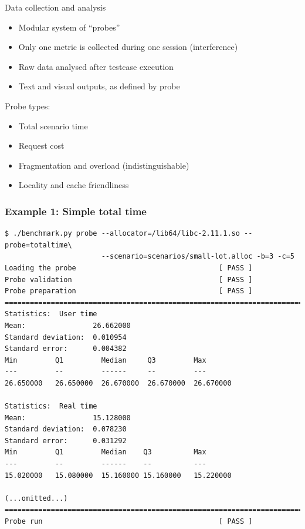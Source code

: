 \documentclass{beamer}
\begin{document}
\begin{frame}{Data collection and analysis}
\begin{itemize}
\item Modular system of ``probes''
\item Only one metric is collected during one session (interference)
\item Raw data analysed after testcase execution
\item Text and visual outputs, as defined by probe
\end{itemize}
Probe types:
\begin{itemize}
  \item Total scenario time
  \item Request cost
  \item Fragmentation and overload (indistinguishable)
  \item Locality and cache friendliness
\end{itemize}
\end{frame}

\begin{frame}[fragile]
\frametitle{Example 1: Simple total time}
\tiny
\begin{verbatim}
$ ./benchmark.py probe --allocator=/lib64/libc-2.11.1.so --probe=totaltime\
                       --scenario=scenarios/small-lot.alloc -b=3 -c=5
Loading the probe                                  [ PASS ]
Probe validation                                   [ PASS ]
Probe preparation                                  [ PASS ]
================================================================================
Statistics:  User time
Mean:                26.662000
Standard deviation:  0.010954
Standard error:      0.004382
Min         Q1         Median     Q3         Max       
---         --         ------     --         ---
26.650000   26.650000  26.670000  26.670000  26.670000

Statistics:  Real time
Mean:                15.128000
Standard deviation:  0.078230
Standard error:      0.031292
Min         Q1         Median    Q3          Max       
---         --         ------    --          ---
15.020000   15.080000  15.160000 15.160000   15.220000

(...omitted...)
================================================================================
Probe run                                          [ PASS ]
\end{verbatim}

\end{frame}
\end{document}

